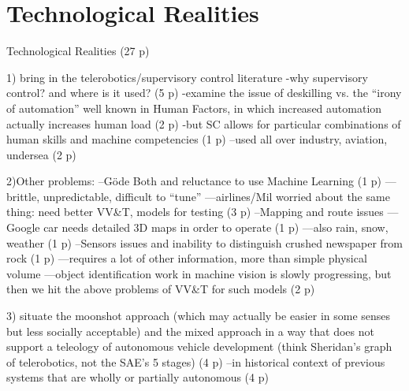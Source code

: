 \chapter{Technological Realities}

Technological Realities (27 p)

1) bring in the telerobotics/supervisory control literature
-why supervisory control? and where is it used? (5 p)
-examine the issue of deskilling vs. the ``irony of automation'' well
known in Human Factors, in which increased automation actually
increases human load (2 p)
-but SC allows for particular combinations of human skills and machine
competencies (1 p)
--used all over industry, aviation, undersea (2 p)

2)Other problems:
--Göde Both and reluctance to use Machine Learning (1 p)
---brittle, unpredictable, difficult to ``tune''
---airlines/Mil worried about the same thing: need better VV&T, models
for testing (3 p)
--Mapping and route issues
---Google car needs detailed 3D maps in order to operate (1 p)
---also rain, snow, weather (1 p)
--Sensors issues and inability to distinguish crushed newspaper from
rock (1 p)
---requires a lot of other information, more than simple physical
volume
---object identification work in machine vision is slowly progressing,
but then we hit the above problems of VV&T for such models (2 p)

3) situate the moonshot approach (which may actually be easier in some
senses but less socially acceptable) and the mixed approach in a way
that does not support a teleology of autonomous vehicle development
(think Sheridan's graph of telerobotics, not the SAE's 5 stages) (4 p)
--in historical context of previous systems that are wholly or
partially autonomous (4 p)


